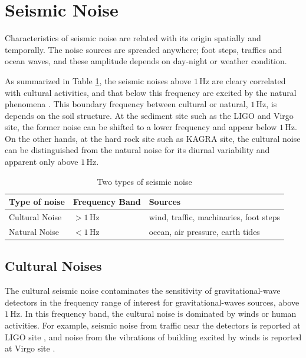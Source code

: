 \section{Seismic Noise}\label{sec:32}
Characteristics of seismic noise are related with its origin spatially and temporally. The noise sources are spreaded anywhere; foot steps, traffics and ocean waves, and these amplitude depends on day-night or weather condition.

As summarized in Table \ref{tb:31}, the seismic noises above $1\,\mathrm{Hz}$ are cleary correlated with cultural activities, and that below this frequency are excited by the natural phenomena \cite{bonnefoy2006nature}. This boundary frequency between cultural or natural, $1\,\mathrm{Hz}$, is depends on the soil structure. At the sediment site such as the LIGO\cite{Daw_2004} and Virgo site\cite{Beker_2012}, the former noise can be shifted to a lower frequency and appear below $1\,\mathrm{Hz}$. On the other hands, at the hard rock site such as KAGRA site, the cultural noise can be distinguished from the natural noise for its diurnal variability and apparent only above $1\,\mathrm{Hz}$.

\begin{table}[h] 
  \begin{center}
    \caption{Two types of seismic noise}\label{tb:31}
    \begin{tabular}{lll} 
      \hline      
      Type of noise & Frequency Band & Sources \\ \hline \hline
      Cultural Noise & $> 1\,\mathrm{Hz}$ & wind, traffic, machinaries, foot steps\\
      Natural Noise  & $< 1\,\mathrm{Hz}$ & ocean, air pressure, earth tides\\
    \end{tabular}
  \end{center}
\end{table}

\subsection{Cultural Noises} \label{sec:321}
The cultural seismic noise contaminates the sensitivity of gravitational-wave detectors in the frequency range of interest for gravitational-waves sources, above $1\,\mathrm{Hz}$. In this frequency band, the cultural noise is dominated by winds or human activities. For example, seismic noise from traffic near the detectors is reported at LIGO site \cite{schofield2000source}, and noise from the vibrations of building excited by winds is reported at Virgo site \cite{acernese2004properties}. 

